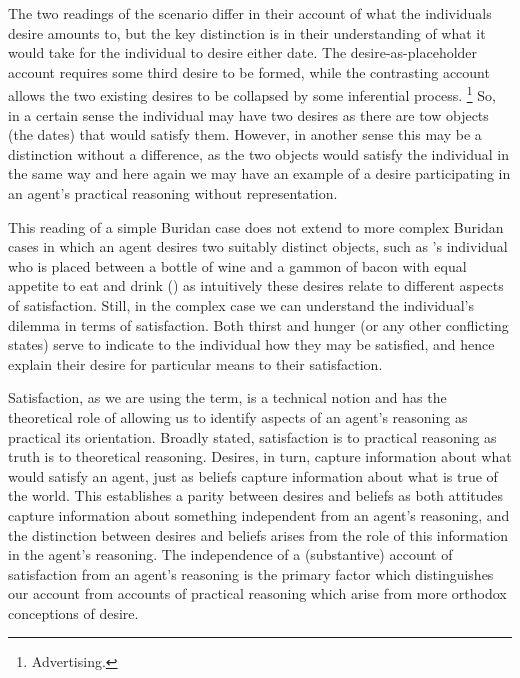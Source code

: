 \documentclass[10pt]{article}
\begin{document}
The two readings of the scenario differ in their account of what the individuals desire amounts to, but the key distinction is in their understanding of what it would take for the individual to desire either date.
The desire-as-placeholder account requires some third desire to be formed, while the contrasting account allows the two existing desires to be collapsed by some inferential process.\nolinebreak
\footnote{\color{red} Advertising.}
So, in a certain sense the individual may have two desires as there are tow objects (the dates) that would satisfy them.
However, in another sense this may be a distinction without a difference, as the two objects would satisfy the individual in the same way and here again we may have an example of a desire participating in an agent's practical reasoning without representation.

This reading of a simple Buridan case does not extend to more complex Buridan cases in which an agent desires two suitably distinct objects, such as \citeauthor{Montaigne:1965aa}'s individual who is placed between a bottle of wine and a gammon of bacon with equal appetite to eat and drink (\cite[cf.][156]{Rescher:1960aa}) as intuitively these desires relate to different aspects of satisfaction.
Still, in the complex case we can understand the individual's dilemma in terms of satisfaction.
Both thirst and hunger (or any other conflicting states) serve to indicate to the individual how they may be satisfied, and hence explain their desire for particular means to their satisfaction.

Satisfaction, as we are using the term, is a technical notion and has the theoretical role of allowing us to identify aspects of an agent's reasoning as practical its orientation.
Broadly stated, satisfaction is to practical reasoning as truth is to theoretical reasoning.
Desires, in turn, capture information about what would satisfy an agent, just as beliefs capture information about what is true of the world.
This establishes a parity between desires and beliefs as both attitudes capture information about something independent from an agent's reasoning, and the distinction between desires and beliefs arises from the role of this information in the agent's reasoning.
The independence of a (substantive) account of satisfaction from an agent's reasoning is the primary factor which distinguishes our account from accounts of practical reasoning which arise from more orthodox conceptions of desire.
\end{document}
